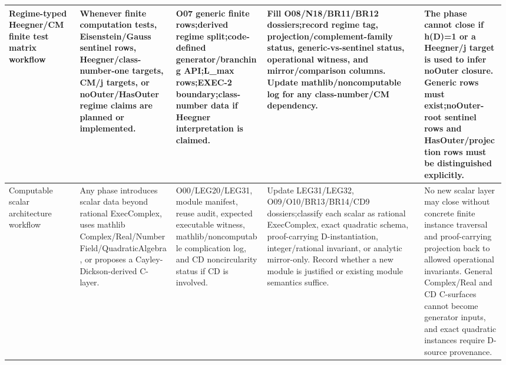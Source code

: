 \begin{longtable}{L{0.14\linewidth} L{0.19\linewidth} L{0.18\linewidth} L{0.31\linewidth} L{0.16\linewidth}}
Regime-typed Heegner/\allowbreak{}CM finite test matrix workflow & Whenever finite computation tests, Eisenstein/\allowbreak{}Gauss sentinel rows, Heegner/\allowbreak{}class-number-one targets, CM/\allowbreak{}j targets, or noOuter/\allowbreak{}HasOuter regime claims are planned or implemented. & O07 generic finite rows;\newline derived regime split;\newline code-defined generator/\allowbreak{}branching API;\newline L\_max rows;\newline EXEC-2 boundary;\newline class-number data if Heegner interpretation is claimed. & Fill O08/\allowbreak{}N18/\allowbreak{}BR11/\allowbreak{}BR12 dossiers;\newline record regime tag, projection/\allowbreak{}complement-family status, generic-vs-sentinel status, operational witness, and mirror/\allowbreak{}comparison columns. Update mathlib/\allowbreak{}noncomputable log for any class-number/\allowbreak{}CM dependency. & The phase cannot close if h(D)=1 or a Heegner/\allowbreak{}j target is used to infer noOuter closure. Generic rows must exist;\newline noOuter-root sentinel rows and HasOuter/\allowbreak{}projection rows must be distinguished explicitly.\\
\hline
\addlinespace[0.24em]
Computable scalar architecture workflow & Any phase introduces scalar data beyond rational ExecComplex, uses mathlib Complex/\allowbreak{}Real/\allowbreak{}NumberField/\allowbreak{}QuadraticAlgebra, or proposes a Cayley-Dickson-derived C-layer. & O00/\allowbreak{}LEG20/\allowbreak{}LEG31, module manifest, reuse audit, expected executable witness, mathlib/\allowbreak{}noncomputable complication log, and CD noncircularity status if CD is involved. & Update LEG31/\allowbreak{}LEG32, O09/\allowbreak{}O10/\allowbreak{}BR13/\allowbreak{}BR14/\allowbreak{}CD9 dossiers;\newline classify each scalar as rational ExecComplex, exact quadratic schema, proof-carrying D-instantiation, integer/\allowbreak{}rational invariant, or analytic mirror-only. Record whether a new module is justified or existing module semantics suffice. & No new scalar layer may close without concrete finite instance traversal and proof-carrying projection back to allowed operational invariants. General Complex/\allowbreak{}Real and CD C-surfaces cannot become generator inputs, and exact quadratic instances require D-source provenance.\\

\end{longtable}
